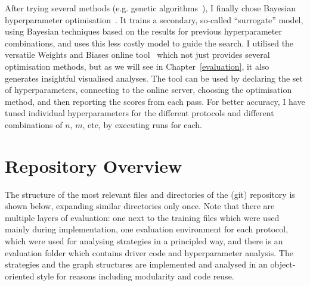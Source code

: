 After trying several methods (e.g. genetic algorithms~\cite{wicaksono2018genetichyper}), I finally chose Bayesian hyperparameter optimisation~\cite{eggensperger2013bayesianhyper}. It trains a secondary, so-called ``surrogate'' model, using Bayesian techniques based on the results for previous hyperparameter combinations, and uses this less costly model to guide the search. I utilised the versatile Weights and Biases online tool~\cite{biewald2020wandb} which not just provides several optimisation methods, but as we will see in Chapter~\ref{evaluation}, it also generates insightful visualised analyses. The tool can be used by declaring the set of hyperparameters, connecting to the online server, choosing the optimisation method, and then reporting the scores from each pass. For better accuracy, I have tuned individual hyperparameters for the different protocols and different combinations of $n$, $m$, etc, by executing \NumberofHyperparameterIterations runs for each.

\section{Repository Overview}

The structure of the most relevant files and directories of the (git) repository is shown below, expanding similar directories only once. Note that there are multiple layers of evaluation: one next to the training files which were used mainly during implementation, one evaluation environment for each protocol, which were used for analysing strategies in a principled way, and there is an evaluation folder which contains driver code and hyperparameter analysis. The strategies and the graph structures are implemented and analysed in an object-oriented style for reasons including modularity and code reuse.



